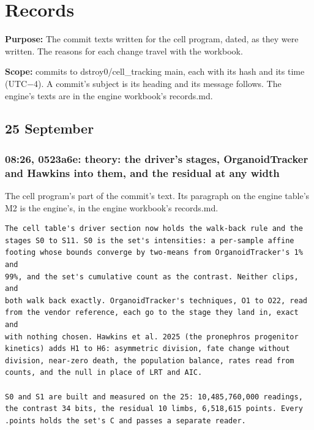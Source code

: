 \chapter{\texorpdfstring{Records}{Records}}
\label{chap:records}

\textbf{Purpose:} The commit texts written for the cell program, dated, as they were written. The reasons for each change travel with the workbook.

\textbf{Scope:} commits to dstroy0/cell\_\allowbreak{}tracking main, each with its hash and its time (UTC−4). A commit's subject is its heading and its message follows. The engine's texts are in the engine workbook's records.md.

\section{\texorpdfstring{25 September}{25 September}}

\subsection{\texorpdfstring{08:26, 0523a6e: theory: the driver's stages, OrganoidTracker and Hawkins into them, and the residual at any width}{08:26, 0523a6e: theory: the driver's stages, OrganoidTracker and Hawkins into them, and the residual at any width}}

The cell program's part of the commit's text. Its paragraph on the engine table's M2 is the engine's, in the engine workbook's records.md.

\begin{Verbatim}
The cell table's driver section now holds the walk-back rule and the
stages S0 to S11. S0 is the set's intensities: a per-sample affine
footing whose bounds converge by two-means from OrganoidTracker's 1% and
99%, and the set's cumulative count as the contrast. Neither clips, and
both walk back exactly. OrganoidTracker's techniques, O1 to O22, read
from the vendor reference, each go to the stage they land in, exact and
with nothing chosen. Hawkins et al. 2025 (the pronephros progenitor
kinetics) adds H1 to H6: asymmetric division, fate change without
division, near-zero death, the population balance, rates read from
counts, and the null in place of LRT and AIC.

S0 and S1 are built and measured on the 25: 10,485,760,000 readings,
the contrast 34 bits, the residual 10 limbs, 6,518,615 points. Every
.points holds the set's C and passes a separate reader.
\end{Verbatim}
